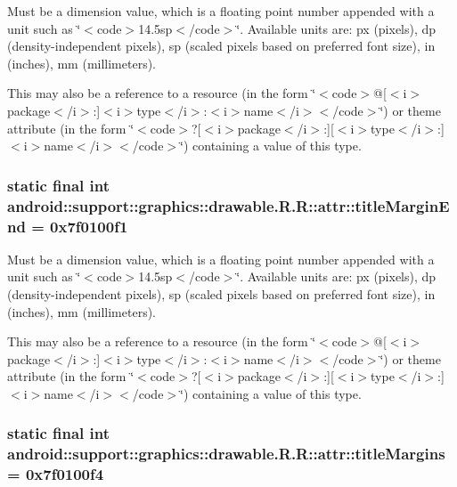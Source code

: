 Must be a dimension value, which is a floating point number appended with a unit such as \char`\"{}$<$code$>$14.5sp$<$/code$>$\char`\"{}. Available units are: px (pixels), dp (density-independent pixels), sp (scaled pixels based on preferred font size), in (inches), mm (millimeters). 

This may also be a reference to a resource (in the form \char`\"{}$<$code$>$@\mbox{[}$<$i$>$package$<$/i$>$:\mbox{]}$<$i$>$type$<$/i$>$:$<$i$>$name$<$/i$>$$<$/code$>$\char`\"{}) or theme attribute (in the form \char`\"{}$<$code$>$?\mbox{[}$<$i$>$package$<$/i$>$:\mbox{]}\mbox{[}$<$i$>$type$<$/i$>$:\mbox{]}$<$i$>$name$<$/i$>$$<$/code$>$\char`\"{}) containing a value of this type. \hypertarget{classandroid_1_1support_1_1graphics_1_1drawable_1_1_r_1_1attr_7aab571fbd38c60fb7d367a30a199ee9}{
\subsubsection[{titleMarginEnd}]{\setlength{\rightskip}{0pt plus 5cm}static final int android::support::graphics::drawable.R.R::attr::titleMarginEnd = 0x7f0100f1}}
\label{classandroid_1_1support_1_1graphics_1_1drawable_1_1_r_1_1attr_7aab571fbd38c60fb7d367a30a199ee9}


Must be a dimension value, which is a floating point number appended with a unit such as \char`\"{}$<$code$>$14.5sp$<$/code$>$\char`\"{}. Available units are: px (pixels), dp (density-independent pixels), sp (scaled pixels based on preferred font size), in (inches), mm (millimeters). 

This may also be a reference to a resource (in the form \char`\"{}$<$code$>$@\mbox{[}$<$i$>$package$<$/i$>$:\mbox{]}$<$i$>$type$<$/i$>$:$<$i$>$name$<$/i$>$$<$/code$>$\char`\"{}) or theme attribute (in the form \char`\"{}$<$code$>$?\mbox{[}$<$i$>$package$<$/i$>$:\mbox{]}\mbox{[}$<$i$>$type$<$/i$>$:\mbox{]}$<$i$>$name$<$/i$>$$<$/code$>$\char`\"{}) containing a value of this type. \hypertarget{classandroid_1_1support_1_1graphics_1_1drawable_1_1_r_1_1attr_696b83c66cd9e6107a2db7402bf54f9c}{
\subsubsection[{titleMargins}]{\setlength{\rightskip}{0pt plus 5cm}static final int android::support::graphics::drawable.R.R::attr::titleMargins = 0x7f0100f4}}
\label{classandroid_1_1support_1_1graphics_1_1drawable_1_1_r_1_1attr_696b83c66cd9e6107a2db7402bf54f9c}


